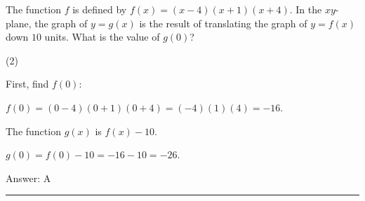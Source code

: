 \documentclass[11pt,paper=a4,answers]{exam}
\begin{document}
\begin{questions}
\vspace{1cm}

\question
The function $f$ is defined by $f(x) = (x - 4)(x + 1)(x + 4)$. In the $xy$-plane, the graph of $y = g(x)$ is the result of translating the graph of $y = f(x)$ down $10$ units. What is the value of $g(0)$?
\begin{tasks}(2)
       
\end{tasks}

\begin{solution}
First, find $f(0)$:
\vspace{5pt}
\begin{center}
$f(0) = (0 - 4)(0 + 1)(0 + 4) = (-4)(1)(4) = -16$.
\end{center}
\vspace{5pt}
The function $g(x)$ is $f(x) - 10$.
\vspace{5pt}
\begin{center}
$g(0) = f(0) - 10 = -16 - 10 = -26$.
\end{center}
\vspace{5pt}
Answer: \colorbox{yellow!100}{A}
\end{solution}


\end{questions}
\begin{center}
\rule{.5\textwidth}{1pt}
\end{center}
\end{document}
